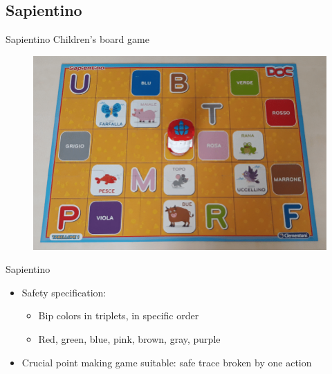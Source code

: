 \documentclass[kul]{kulakbeamer}
\begin{document}
\subsection{Sapientino}
\begin{frame}{Sapientino}
    Children's board game
    \begin{figure}
        \centering
        \includegraphics[width=.8\textwidth]{sapientino.png}
    \end{figure}
\end{frame}
\begin{frame}{Sapientino}
    \begin{itemize}
        \item Safety specification:
        \begin{itemize}
            \item Bip colors in triplets, in specific order
            \item Red, green, blue, pink, brown, gray, purple 
        \end{itemize}{}
        \item Crucial point making game suitable: safe trace broken by one action
    \end{itemize}{}
\end{frame}{}
\end{document}
